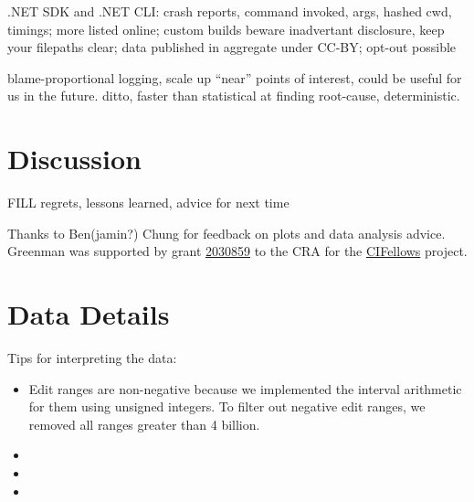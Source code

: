 \documentclass[english,submission,cleveref]{programming}
\begin{document}
.NET SDK and .NET CLI:
crash reports, command invoked, args, hashed cwd, timings;
more listed online;
custom builds beware inadvertant disclosure, keep your filepaths clear;
data published in aggregate under CC-BY;
opt-out possible~\cite{dotnet-telemetry}


\cite{lnsmc-usenix-2018} blame-proportional logging,
scale up ``near'' points of interest,
could be useful for us in the future.
\cite{fnm-sigmod-2020} ditto, faster than statistical at finding root-cause,
deterministic.



\section{Discussion}
\label{s:conclusion}
\label{s:discussion}

FILL regrets, lessons learned, advice for next time



\acks

Thanks to Ben(jamin?) Chung for feedback on plots and data analysis advice.
Greenman was supported by
grant \href{https://nsf.gov/awardsearch/showAward?AWD_ID=2030859&HistoricalAwards=false}{2030859}
to the CRA for the \href{https://cifellows2020.org}{CIFellows} project.

\newpage

\appendix

\section{Data Details}

Tips for interpreting the data:

\begin{itemize}
  \item
    Edit ranges are non-negative because we
    implemented the interval arithmetic for them using unsigned integers.
    To filter out negative edit ranges, we removed all ranges
    greater than 4 billion.

  \item
  \item
  \item
\end{itemize}

\newpage


\end{document}
